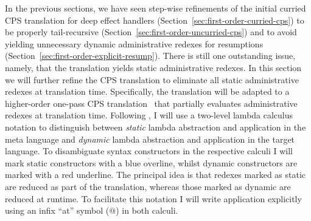 \documentclass[12pt,phd,lfcs,twoside,openright,logo,leftchapter,normalheadings]{infthesis}
\theoremstyle{plain}
\theoremstyle{definition}
\begin{document}
%
In the previous sections, we have seen step-wise refinements of the
initial curried CPS translation for deep effect handlers
(Section~\ref{sec:first-order-curried-cps}) to be properly
tail-recursive (Section~\ref{sec:first-order-uncurried-cps}) and to
avoid yielding unnecessary dynamic administrative redexes for
resumptions (Section~\ref{sec:first-order-explicit-resump}).
%
There is still one outstanding issue, namely, that the translation
yields static administrative redexes. In this section we will further
refine the CPS translation to eliminate all static administrative
redexes at translation time.
%
Specifically, the translation will be adapted to a higher-order
one-pass CPS translation~\citep{DanvyF90} that partially evaluates
administrative redexes at translation time.
%
Following \citet{DanvyN03}, I will use a two-level lambda calculus
notation to distinguish between \emph{static} lambda abstraction and
application in the meta language and \emph{dynamic} lambda abstraction
and application in the target language. To disambiguate syntax
constructors in the respective calculi I will mark static constructors
with a {\color{blue}$\overline{\text{blue overline}}$}, whilst dynamic
constructors are marked with a
{\color{red}$\underline{\text{red underline}}$}. The principal idea is
that redexes marked as static are reduced as part of the translation,
whereas those marked as dynamic are reduced at runtime. To facilitate
this notation I will write application explicitly using an infix
``at'' symbol ($@$) in both calculi.
\end{document}

